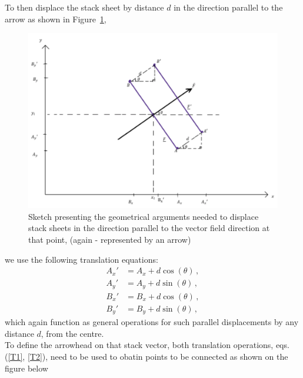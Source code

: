 \documentclass[11]{report}
\begin{document}
To then displace the stack sheet by distance $d$ in the direction parallel to the arrow as shown in Figure~\ref{fig:parallel disp.},
\begin{figure}[H]
	\centering
	\includegraphics[scale=0.38]{Documentation_images/Geometry of 1 stack sheet, displacement 1}
	\caption{Sketch presenting the geometrical arguments needed to displace stack sheets in the direction parallel to the vector field direction at that point, (again - represented by an arrow)}
	\label{fig:parallel disp.}
\end{figure}
\noindent we use the following translation equations:
\begin{equation}
\label{T2} \begin{split}
A_x' &= A_x + d \cos(\theta)\,, \\
A_y' &= A_y + d \sin(\theta)\,, \\
B_x' &= B_x + d \cos(\theta)\,, \\
B_y' &= B_y + d \sin(\theta)\,, 
\end{split}
\end{equation}
which again function as general operations for such parallel displacements by any distance \( d \), from the centre.\\
To define the arrowhead on that stack vector, both translation operations, eqs. (\ref{T1}, \ref{T2}), need to be used to obatin points to be connected as shown on the figure below
\end{document}
